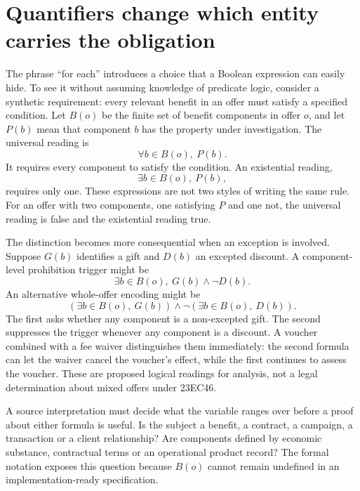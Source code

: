 \documentclass[12pt,a4paper,oneside,openany]{book}
\begin{document}
\section{Quantifiers change which entity carries the obligation}
\label{merge:M03:01}


The phrase ``for each'' introduces a choice that a Boolean expression can easily
hide. To see it without assuming knowledge of predicate logic, consider a
synthetic requirement: every relevant benefit in an offer must satisfy a specified
condition. Let $B(o)$ be the finite set of benefit components in offer $o$, and
let $P(b)$ mean that component $b$ has the property under investigation. The
universal reading is
\begin{equation}
 \forall b\in B(o),\ P(b).
 \label{eq:universal-benefit}
\end{equation}
It requires every component to satisfy the condition. An existential reading,
\begin{equation}
 \exists b\in B(o),\ P(b),
 \label{eq:existential-benefit}
\end{equation}
requires only one. These expressions are not two styles of writing the same rule.
For an offer with two components, one satisfying $P$ and one not, the universal
reading is false and the existential reading true.

The distinction becomes more consequential when an exception is involved. Suppose
$G(b)$ identifies a gift and $D(b)$ an excepted discount. A component-level
prohibition trigger might be
\begin{equation}
 \exists b\in B(o),\ G(b)\land\neg D(b).
 \label{eq:component-exception}
\end{equation}
An alternative whole-offer encoding might be
\begin{equation}
 \left(\exists b\in B(o),\ G(b)\right)
 \land\neg\left(\exists b\in B(o),\ D(b)\right).
 \label{eq:offer-exception}
\end{equation}
The first asks whether any component is a non-excepted gift. The second suppresses
the trigger whenever any component is a discount. A voucher combined with a fee
waiver distinguishes them immediately: the second formula can let the waiver
cancel the voucher's effect, while the first continues to assess the voucher.
These are proposed logical readings for analysis, not a legal determination about
mixed offers under 23EC46.

A source interpretation must decide what the variable ranges over before a proof
about either formula is useful. Is the subject a benefit, a contract, a campaign,
a transaction or a client relationship? Are components defined by economic
substance, contractual terms or an operational product record? The formal
notation exposes this question because $B(o)$ cannot remain undefined in an
implementation-ready specification.
\end{document}

